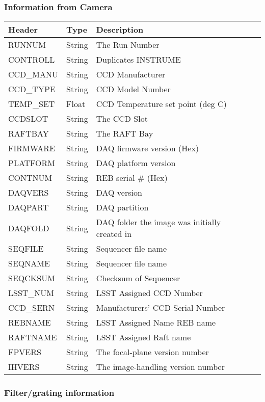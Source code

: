 \subsubsection{Information from Camera}


\begin{tabular}{l l l l l}
\hline
Header & Type & Description \\
\hline
RUNNUM & String & The Run Number \\
CONTROLL & String & Duplicates INSTRUME \\
CCD\_MANU & String & CCD Manufacturer \\
CCD\_TYPE & String & CCD Model Number \\
TEMP\_SET & Float & CCD Temperature set point (deg C) \\
CCDSLOT & String & The CCD Slot \\
RAFTBAY & String & The RAFT Bay \\
FIRMWARE & String & DAQ firmware version (Hex) \\
PLATFORM & String & DAQ platform version \\
CONTNUM & String & REB serial \# (Hex) \\
DAQVERS & String & DAQ version \\
DAQPART & String & DAQ partition \\
DAQFOLD & String & DAQ folder the image was initially created in \\
SEQFILE & String & Sequencer file name \\
SEQNAME & String & Sequencer file name \\
SEQCKSUM & String & Checksum of Sequencer \\
LSST\_NUM & String & LSST Assigned CCD Number \\
CCD\_SERN & String & Manufacturers’ CCD Serial Number \\
REBNAME & String & LSST Assigned Name REB name \\
RAFTNAME & String & LSST Assigned Raft name \\
FPVERS & String & The focal-plane version number \\
IHVERS & String & The image-handling version number \\
\hline
\end{tabular}


\subsubsection{Filter/grating information}


